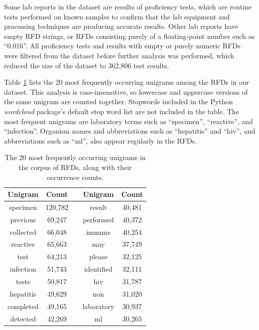 \documentclass[sigconf]{acmart}
\begin{document}
Some lab reports in the dataset are results of proficiency tests, which are routine tests performed on known samples to confirm that the lab equipment and processing techniques are producing accurate results. Other lab reports have empty RFD strings, or RFDs consisting purely of a floating-point number such as ``0.016''. All proficiency tests and results with empty or purely numeric RFDs were filtered from the dataset before further analysis was performed, which reduced the size of the dataset to 362,806 test results.

Table \ref{tab:dataset_counts} lists the 20 most frequently occurring unigrams among the RFDs in our dataset. This analysis is case-insensitive, so lowercase and uppercase versions of the same unigram are counted together. Stopwords included in the Python \textit{wordcloud} package's default stop word list are not included in the table. The most frequent unigrams are laboratory terms such as ``specimen'', ``reactive'', and ``infection''. Organism names and abbreviations such as ``hepatitis'' and ``hiv'', and abbreviations such as ``ml'', also appear regularly in the RFDs.

\begin{table}
    \caption{The 20 most frequently occurring unigrams in the corpus of RFDs, along with their occurrence counts.}
    \label{tab:dataset_counts}
    
    \begin{tabular}{ccccc}
        \toprule
        Unigram & Count & \quad & Unigram & Count \\
        \midrule
        specimen & 120,782 & \quad & result & 40,481 \\
        previous & 69,247 & \quad & performed & 40,372 \\
        collected & 66,048 & \quad & immune & 40,254 \\
        reactive & 65,663 & \quad & may & 37,749 \\
        test & 64,213 & \quad & please & 32,125 \\
        infection & 51,743 & \quad & identified & 32,111 \\
        tests & 50,817 & \quad & hiv & 31,787 \\
        hepatitis & 49,629 & \quad & non & 31,020 \\
        completed & 49,165 & \quad & laboratory & 30,937 \\
        detected & 42,269 & \quad & ml & 30,265 \\
        \bottomrule
    \end{tabular}
\end{table}
\end{document}
